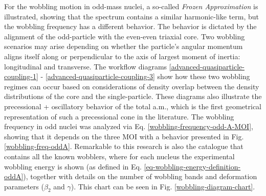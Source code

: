 For the wobbling motion in odd-mass nuclei, a so-called \emph{Frozen Approximation} is illustrated, showing that the spectrum contains a similar harmonic-like term, but the wobbling frequency has a different behavior. The behavior is dictated by the alignment of the odd-particle with the even-even triaxial core. Two wobbling scenarios may arise depending on whether the particle’s angular momentum aligns itself along or perpendicular to the axis of largest moment of inertia: longitudinal and transverse. The workflow diagrams \ref{advanced-quasiparticle-coupling-1} - \ref{advanced-quasiparticle-coupling-3} show how these two wobbling regimes can occur based on considerations of density overlap between the density distributions of the core and the single-particle. These diagrams also illustrate the precessional + oscillatory behavior of the total a.m., which is the first geometrical representation of such a precessional cone in the literature. The wobbling frequency in odd nuclei was analyzed via Eq. \eqref{wobbling-frequency-odd-A-MOI}, showing that it depends on the three MOI with a behavior presented in Fig. \ref{wobbling-freq-oddA}. Remarkable to this research is also the catalogue that contains all the known wobblers, where for each nucleus the experimental wobbling energy is shown (as defined in Eq. \eqref{eq-wobbling-energy-definition-oddA}), together with details on the number of wobbling bands and deformation parameters ($\beta_2$ and $\gamma$). This chart can be seen in Fig. \ref{wobbling-diagram-chart}.

